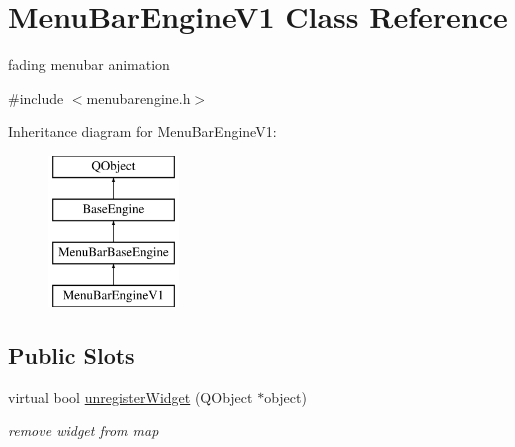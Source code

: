 \hypertarget{class_menu_bar_engine_v1}{}\section{Menu\+Bar\+Engine\+V1 Class Reference}
\label{class_menu_bar_engine_v1}


fading menubar animation  




{\ttfamily \#include $<$menubarengine.\+h$>$}

Inheritance diagram for Menu\+Bar\+Engine\+V1\+:\begin{figure}[H]
\begin{center}
\leavevmode
\includegraphics[height=4.000000cm]{class_menu_bar_engine_v1}
\end{center}
\end{figure}
\subsection*{Public Slots}
\begin{DoxyCompactItemize}
\item 
\mbox{\label{class_menu_bar_engine_v1_a6fe1beaaef58a43481a2a6afebc58bb1}} 
virtual bool \hyperlink{class_menu_bar_engine_v1_a6fe1beaaef58a43481a2a6afebc58bb1}{unregister\+Widget} (Q\+Object $\ast$object)
\begin{DoxyCompactList}\small\item\em remove widget from map \end{DoxyCompactList}\end{DoxyCompactItemize}

